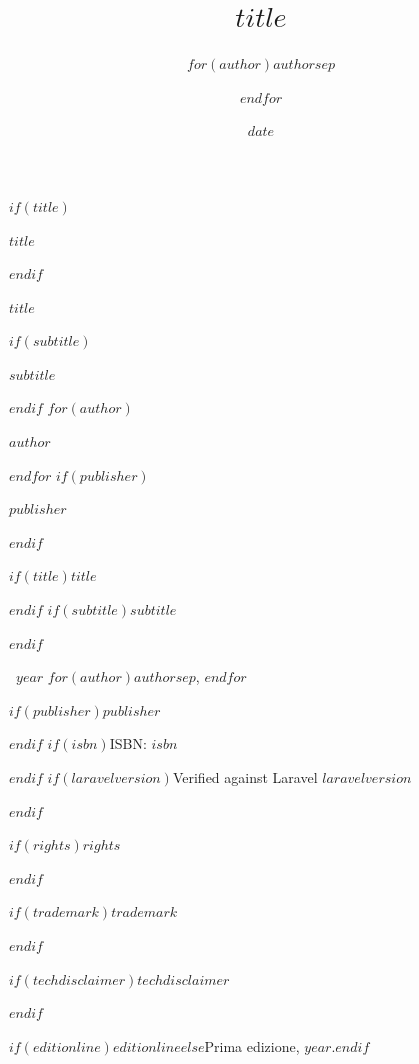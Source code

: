 \documentclass[
$if(fontsize)$
  $fontsize$,
$else$
  11pt,
$endif$
  twoside
]{article}
\title{$title$}
\author{$for(author)$$author$$sep$ \and $endfor$}
\author{}
\date{$date$}
\date{}
\makeatletter
\def\cleardoublepage{\clearpage\if@twoside
  \ifodd\c@page\else
    \hbox{}\thispagestyle{empty}\newpage
    \if@twocolumn\hbox{}\newpage\fi
  \fi
\fi}
\makeatother
\begin{document}
\hypersetup{linkcolor=Dark}

$if(title)$
\thispagestyle{empty}
\begin{center}
\vspace*{6cm}
{\LARGE\sffamily\bfseries\color{Dark}$title$\par}
\end{center}
\cleardoublepage
$endif$

\thispagestyle{empty}
\begin{center}
\vspace*{4cm}
{\Huge\sffamily\bfseries\color{Dark}$title$\par}
$if(subtitle)$
\vspace{0.8cm}
{\large\sffamily\color{Muted}$subtitle$\par}
$endif$
\vspace{2.5cm}
$for(author)$
{\Large\sffamily\color{Dark}$author$\par}
$endfor$
\vfill
$if(publisher)$
{\normalsize\sffamily\color{Muted}$publisher$\par}
$endif$
\vspace{1cm}
\end{center}
\clearpage

\thispagestyle{empty}
\null\vfill
{\footnotesize\sffamily\color{Muted}
$if(title)$\textbf{$title$}\par$endif$
$if(subtitle)$$subtitle$\par$endif$
\vspace{0.6em}

\textcopyright{}~$year$ $for(author)$$author$$sep$, $endfor$\par
$if(publisher)$$publisher$\par$endif$
$if(isbn)$ISBN: $isbn$\par$endif$
$if(laravelversion)$Verified against Laravel $laravelversion$\par$endif$
\vspace{0.6em}

$if(rights)$$rights$\par$endif$
\vspace{0.4em}

$if(trademark)$$trademark$\par$endif$
\vspace{0.4em}

$if(techdisclaimer)$$techdisclaimer$\par$endif$
\vspace{0.6em}

$if(editionline)$$editionline$$else$Prima edizione, $year$.$endif$\par
}
\cleardoublepage
\end{document}
